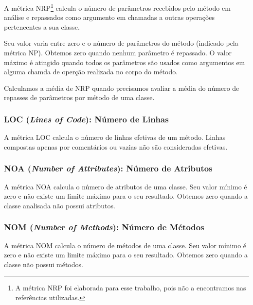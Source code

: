 A métrica NRP\footnote{A métrica NRP foi elaborada para esse trabalho, pois não a encontramos nas referências utilizadas.} calcula o número de parâmetros recebidos pelo método em análise e repassados como argumento em chamadas a outras operações pertencentes a sua classe.                                                    
	
Seu valor varia entre zero e o número de parâmetros do método (indicado pela métrica NP). Obtemos zero quando nenhum parâmetro é repassado. O valor máximo é atingido quando todos os parâmetros são usados como argumentos em alguma chamda de operção realizada no corpo do método. 
                              
Calculamos a média de NRP quando precisamos avaliar a média do número de repasses de parâmetros por método de uma classe.
                        
                                                             
\subsubsection{LOC (\textit{Lines of Code}): Número de Linhas}

A métrica LOC \citep{LK94} calcula o número de linhas efetivas de um método. Linhas compostas apenas por comentários ou vazias não são consideradas efetivas.
 

\subsubsection{NOA (\textit{Number of Attributes}): Número de Atributos}

A métrica NOA calcula o número de atributos de uma classe. Seu valor mínimo é zero e não existe um limite máximo para o seu resultado. Obtemos zero quando a classe analisada não possui atributos.
                         

\subsubsection{NOM (\textit{Number of Methods}): Número de Métodos}

A métrica NOM calcula o número de métodos de uma classe. Seu valor mínimo é zero e não existe um limite máximo para o seu resultado. Obtemos zero quando a classe não possui métodos.                                                                   
                           
                                                        
